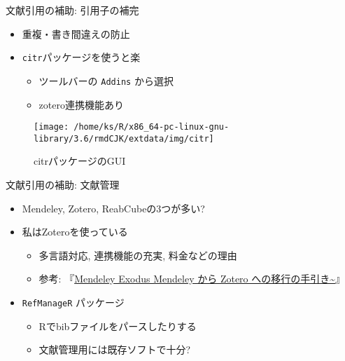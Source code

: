 \documentclass[
  12pt,
  ignorenonframetext,
]{beamer}
\providecommand{\tightlist}{%
  \setlength{\itemsep}{0pt}\setlength{\parskip}{0pt}}
\begin{document}
\begin{frame}[fragile]{文献引用の補助: 引用子の補完}
\protect\hypertarget{ux6587ux732eux5f15ux7528ux306eux88dcux52a9-ux5f15ux7528ux5b50ux306eux88dcux5b8c}{}

\begin{itemize}
\tightlist
\item
  重複・書き間違えの防止
\item
  \texttt{citr}パッケージを使うと楽

  \begin{itemize}
  \tightlist
  \item
    ツールバーの \texttt{Addins} から選択
  \item
    zotero連携機能あり
  \end{itemize}
\end{itemize}

\begin{figure}

{\centering \texttt{[image: /home/ks/R/x86\_64-pc-linux-gnu-library/3.6/rmdCJK/extdata/img/citr]} 

}

\caption{citrパッケージのGUI}\label{fig:citr-image}
\end{figure}

\end{frame}

\begin{frame}[fragile]{文献引用の補助: 文献管理}
\protect\hypertarget{ux6587ux732eux5f15ux7528ux306eux88dcux52a9-ux6587ux732eux7ba1ux7406}{}

\begin{itemize}
\tightlist
\item
  Mendeley, Zotero, ReabCubeの3つが多い?
\item
  私はZoteroを使っている

  \begin{itemize}
  \tightlist
  \item
    多言語対応, 連携機能の充実, 料金などの理由
  \item
    参考:
    『\href{https://ill-identified.hatenablog.com/entry/2019/03/05/195257}{Mendeley
    Exodus Mendeley から Zotero への移行の手引き\textasciitilde{}}』
  \end{itemize}
\item
  \texttt{RefManageR} パッケージ

  \begin{itemize}
  \tightlist
  \item
    Rでbibファイルをパースしたりする
  \item
    文献管理用には既存ソフトで十分?
  \end{itemize}
\end{itemize}

\end{frame}
\end{document}
